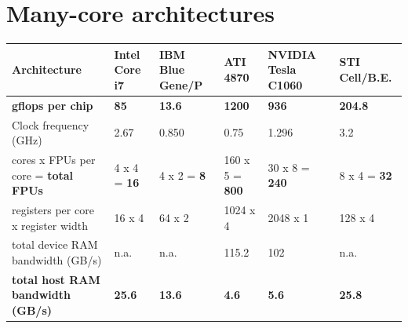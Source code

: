 \documentclass{article}
\begin{document}
\section{Many-core architectures}

\begin{table}[t]
\begin{center}
{\footnotesize
\begin{tabular}{|l|l|l|l|l|l|}                                                   
\hline
Architecture                                 & Intel Core i7 & IBM Blue Gene/P& ATI 4870 &  NVIDIA Tesla C1060 & STI Cell/B.E. \\
\hline
\textbf{gflops per chip}                     & \textbf{85}   & \textbf{13.6}  & \textbf{1200}  & \textbf{936}  & \textbf{204.8}\\
Clock frequency (GHz)                        & 2.67          & 0.850          & 0.75           & 1.296         & 3.2           \\
cores x FPUs per core = \textbf{total FPUs}  & 4 x 4 = \textbf{16} & 4 x 2 = \textbf{8} & 160 x 5 = \textbf{800} & 30 x 8 = \textbf{240} & 8 x 4 = \textbf{32} \\
registers per core x register width          & 16 x 4        & 64 x 2         & 1024 x 4      & 2048 x 1       & 128 x 4       \\
total device RAM bandwidth (GB/s)            & n.a.          & n.a.           & 115.2         & 102            & n.a.          \\
\textbf{total host RAM bandwidth (GB/s)}     & \textbf{25.6} & \textbf{13.6}  & \textbf{4.6}  & \textbf{5.6}   & \textbf{25.8} \\

\end{tabular}}
\end{center}
\end{table}
\end{document}
